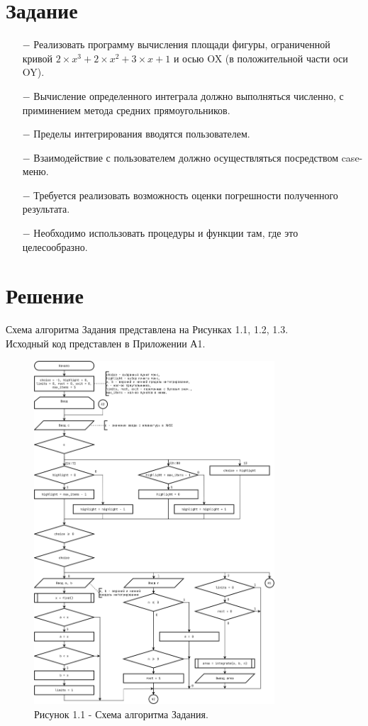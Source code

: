 \documentclass[oneside,a4paper,14pt]{extarticle}
\begin{document}
\section*{Задание}
\begin{itemize}
    \item[$-$] Реализовать программу вычисления площади фигуры, ограниченной кривой $2 \times x^3 + 2 \times x^2 + 3 \times x + 1$ и осью OX (в положительной части оси OY).
    \item[$-$] Вычисление определенного интеграла должно выполняться численно, с приминением метода средних прямоугольников.
    \item[$-$] Пределы интегрирования вводятся пользователем.
    \item[$-$] Взаимодействие с пользователем должно осуществляться посредством case-меню.
    \item[$-$] Требуется реализовать возможность оценки погрешности полученного результата.
    \item[$-$] Необходимо использовать процедуры и функции там, где это целесообразно.

\end{itemize}

\section*{Решение}
\noindent Схема алгоритма Задания представлена на Рисунках 1.1, 1.2, 1.3.\\
\noindent Исходный код представлен в Приложении А1.\\
\newpage
\begin{figure}[!ht]
	\centering
	\includegraphics[width=0.8\textwidth]{pics/flowchart_p1.png}
	\caption*{Рисунок 1.1 - Схема алгоритма Задания.}
\end{figure}
\end{document}
